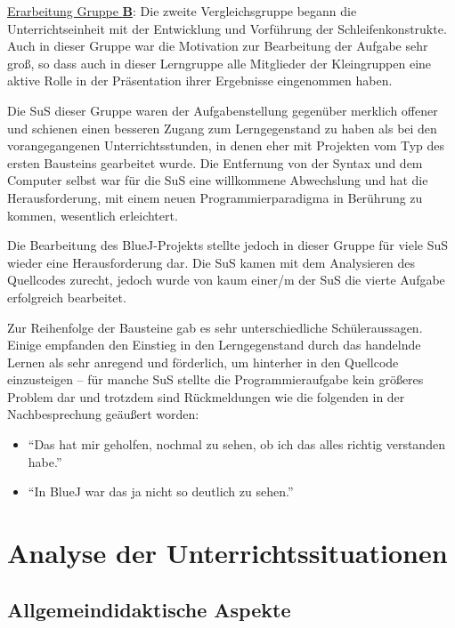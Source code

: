 \documentclass[paper=a4, DIV=13, BCOR=12mm, twoside=on, onecolumn=on, open = any, titlepage =on, parskip =half-, headsepline = on, footsepline = on, chapterprefix = on, sectionprefix = on, appendixprefix = off, fontsize = 12pt, numbers = noenddot, abstract = off]{scrreprt}
\begin{document}
\underline{Erarbeitung Gruppe \textsc{\textbf{B}}}: Die zweite Vergleichsgruppe begann die Unterrichtseinheit mit der Entwicklung und Vorführung der Schleifenkonstrukte. Auch in dieser Gruppe war die Motivation zur Bearbeitung der Aufgabe sehr groß, so dass auch in dieser Lerngruppe alle Mitglieder der Kleingruppen eine aktive Rolle in der Präsentation ihrer Ergebnisse eingenommen haben. 

Die SuS dieser Gruppe waren der Aufgabenstellung gegenüber merklich offener und schienen einen besseren Zugang zum Lerngegenstand zu haben als bei den vorangegangenen Unterrichtsstunden, in denen eher mit Projekten vom Typ des ersten Bausteins gearbeitet wurde. Die Entfernung von der Syntax und dem Computer selbst war für die SuS eine willkommene Abwechslung und hat die Herausforderung, mit einem neuen Programmierparadigma in Berührung zu kommen, wesentlich erleichtert.

Die Bearbeitung des BlueJ-Projekts stellte jedoch in dieser Gruppe für viele SuS wieder eine Herausforderung dar. Die SuS kamen mit dem Analysieren des Quellcodes zurecht, jedoch wurde von kaum einer/m der SuS die vierte Aufgabe erfolgreich bearbeitet. 

Zur Reihenfolge der Bausteine gab es sehr unterschiedliche Schüleraussagen. Einige empfanden den Einstieg in den Lerngegenstand durch das handelnde Lernen als sehr anregend und förderlich, um hinterher in den Quellcode einzusteigen -- für manche SuS stellte die Programmieraufgabe kein größeres Problem dar und trotzdem sind Rückmeldungen wie die folgenden in der Nachbesprechung geäußert worden:

\singlespacing
\begin{itemize}
\item "`Das hat mir geholfen, nochmal zu sehen, ob ich das alles richtig verstanden habe."'
\item "`In BlueJ war das ja nicht so deutlich zu sehen."'
\end{itemize}
\onehalfspacing


\par \singlespacing
 \section{Analyse der Unterrichtssituationen}
 \label{analyse}
\onehalfspacing
\vspace*{-0.5cm}
\par \singlespacing
\subsection*{Allgemeindidaktische Aspekte}
\onehalfspacing
\end{document}
